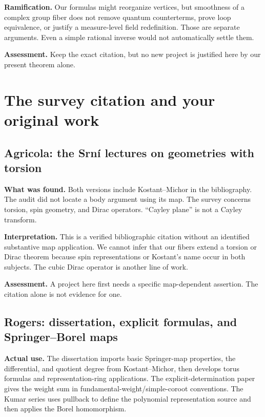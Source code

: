 \textbf{Ramification.} Our formulas might reorganize vertices, but smoothness of a complex group fiber does not remove quantum counterterms, prove loop equivalence, or justify a measure-level field redefinition. Those are separate arguments. Even a simple rational inverse would not automatically settle them.

\textbf{Assessment.} Keep the exact citation, but no new project is justified here by our present theorem alone.

\section{The survey citation and your original work}
\subsection{Agricola: the Srn\'i lectures on geometries with torsion}

\textbf{What was found.} Both versions include Kostant--Michor in the bibliography. The audit did not locate a body argument using its map. The survey concerns torsion, spin geometry, and Dirac operators. ``Cayley plane'' is not a Cayley transform.

\textbf{Interpretation.} This is a verified bibliographic citation without an identified substantive map application. We cannot infer that our fibers extend a torsion or Dirac theorem because spin representations or Kostant's name occur in both subjects. The cubic Dirac operator is another line of work.

\textbf{Assessment.} A project here first needs a specific map-dependent assertion. The citation alone is not evidence for one.

\subsection{Rogers: dissertation, explicit formulas, and Springer--Borel maps}

\textbf{Actual use.} The dissertation imports basic Springer-map properties, the differential, and quotient degree from Kostant--Michor, then develops torus formulas and representation-ring applications. The explicit-determination paper gives the weight sum in fundamental-weight/simple-coroot conventions. The Kumar series uses pullback to define the polynomial representation source and then applies the Borel homomorphism.


